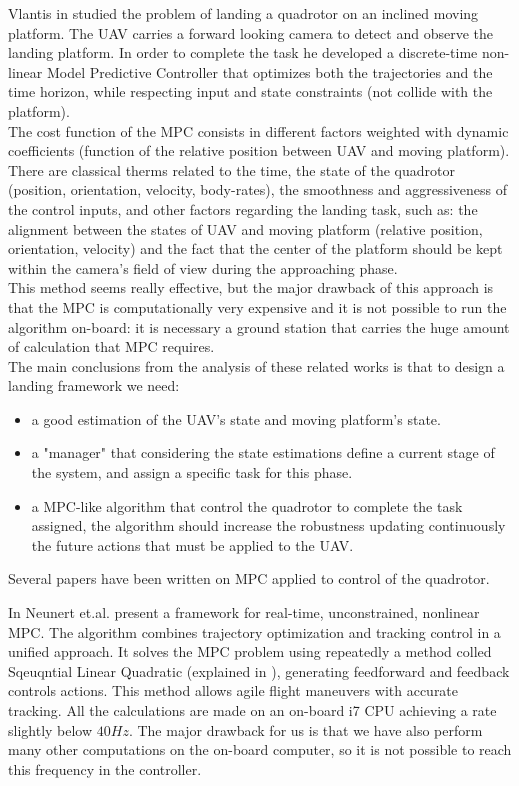 Vlantis in \cite{vlantis2015quadrotor} studied the problem of landing a quadrotor on an inclined moving platform. The UAV carries a forward looking camera to detect and observe the landing platform. In order to complete the task he developed a discrete-time non-linear Model Predictive Controller \cite{camacho2013model}  that optimizes both the trajectories and the time horizon, while respecting input and state constraints (not collide with the platform).\\ 
The cost function of the MPC consists in different factors weighted with dynamic coefficients (function of the relative position between UAV and moving platform). There are classical therms related to the time, the state of the quadrotor (position, orientation, velocity, body-rates), the smoothness and aggressiveness of the control inputs, and other factors regarding the landing task, such as: the alignment between the states of UAV and moving platform (relative position, orientation, velocity) and the fact that the center of the platform should be kept within the camera's field of view during the approaching phase.\\
This method seems really effective, but the major drawback of this approach is that the MPC is computationally very expensive and it is not possible to run the algorithm on-board: it is necessary a ground station that carries the huge amount of calculation that MPC requires.\\

The main conclusions from the analysis of these related works is that to design a landing framework we need:
\begin{itemize}
\item a good estimation of the UAV's state and moving platform's state.
\item a "manager" that considering the state estimations define a current stage of the system, and assign a specific task for this phase.
\item a MPC-like algorithm that control the quadrotor to complete the task assigned, the algorithm should increase the robustness updating continuously the future actions that must be applied to the UAV.
\end{itemize}


Several papers have been written on MPC applied to control of the quadrotor.

In \cite{neunertfast} Neunert et.al. present a framework for real-time, unconstrained, nonlinear MPC. The algorithm combines trajectory optimization and tracking control in a unified approach. It solves the MPC problem using repeatedly a method colled Sqeuqntial Linear Quadratic (explained in \cite{sideris2005efficient}), generating feedforward and feedback controls actions. This method allows agile flight maneuvers with accurate tracking. All the calculations are made on an on-board i7 CPU achieving a rate slightly below $40Hz$. The major drawback for us is that we have also perform many other computations on the on-board computer, so it is not possible to reach this frequency in the controller.

